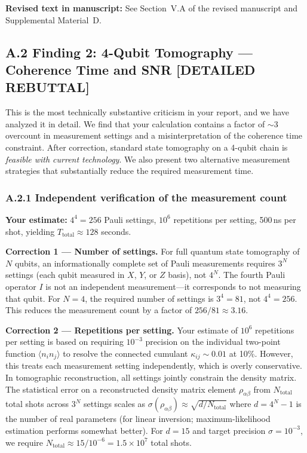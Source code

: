 \documentclass[11pt,a4paper]{article}
\begin{document}
\textbf{Revised text in manuscript:} See Section~V.A of the revised manuscript and Supplemental Material~D.

\subsection*{A.2 Finding 2: 4-Qubit Tomography --- Coherence Time and SNR [DETAILED REBUTTAL]}

This is the most technically substantive criticism in your report, and we have analyzed it in detail. We find that your calculation contains a factor of $\sim$3 overcount in measurement settings and a misinterpretation of the coherence time constraint. After correction, standard state tomography on a 4-qubit chain is \emph{feasible with current technology}. We also present two alternative measurement strategies that substantially reduce the required measurement time.

\subsubsection*{A.2.1 Independent verification of the measurement count}

\textbf{Your estimate:} $4^4 = 256$ Pauli settings, $10^6$ repetitions per setting, 500\,ns per shot, yielding $T_{\text{total}} \approx 128$ seconds.

\textbf{Correction 1 --- Number of settings.} For full quantum state tomography of $N$ qubits, an informationally complete set of Pauli measurements requires $3^N$ settings (each qubit measured in $X$, $Y$, or $Z$ basis), not $4^N$. The fourth Pauli operator $I$ is not an independent measurement---it corresponds to not measuring that qubit. For $N = 4$, the required number of settings is $3^4 = 81$, not $4^4 = 256$. This reduces the measurement count by a factor of $256/81 \approx 3.16$.

\textbf{Correction 2 --- Repetitions per setting.} Your estimate of $10^6$ repetitions per setting is based on requiring $10^{-3}$ precision on the individual two-point function $\langle n_i n_j \rangle$ to resolve the connected cumulant $\kappa_{ij} \sim 0.01$ at 10\%. However, this treats each measurement setting independently, which is overly conservative. In tomographic reconstruction, all settings jointly constrain the density matrix. The statistical error on a reconstructed density matrix element $\rho_{\alpha\beta}$ from $N_{\text{total}}$ total shots across $3^N$ settings scales as $\sigma(\rho_{\alpha\beta}) \approx \sqrt{d / N_{\text{total}}}$ where $d = 4^N - 1$ is the number of real parameters (for linear inversion; maximum-likelihood estimation performs somewhat better). For $d = 15$ and target precision $\sigma = 10^{-3}$, we require $N_{\text{total}} \approx 15 / 10^{-6} = 1.5 \times 10^7$ total shots.
\end{document}

